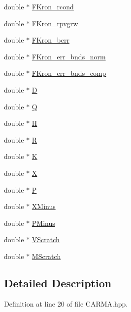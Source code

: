 \begin{DoxyCompactItemize}
\item 
double $\ast$ \hyperlink{class_c_a_r_m_a_a4d0801b15644b2e5b0580b0688119737}{F\-Kron\-\_\-rcond}
\item 
double $\ast$ \hyperlink{class_c_a_r_m_a_ae089a1c6d303b4c9573c943c0a729269}{F\-Kron\-\_\-rpvgrw}
\item 
double $\ast$ \hyperlink{class_c_a_r_m_a_acae4a7d06cd91dfc10cf0c1bf87f6689}{F\-Kron\-\_\-berr}
\item 
double $\ast$ \hyperlink{class_c_a_r_m_a_a859299a912a8613c5143b8b9878b5842}{F\-Kron\-\_\-err\-\_\-bnds\-\_\-norm}
\item 
double $\ast$ \hyperlink{class_c_a_r_m_a_ac95cc03cafb7ce94ecccf055462b487a}{F\-Kron\-\_\-err\-\_\-bnds\-\_\-comp}
\item 
double $\ast$ \hyperlink{class_c_a_r_m_a_a95cd26896bd2a97497be37295e039dc8}{D}
\item 
double $\ast$ \hyperlink{class_c_a_r_m_a_a1cd98bc094e960bcf7d8af55528ae72c}{Q}
\item 
double $\ast$ \hyperlink{class_c_a_r_m_a_aa2f506e700aa176fd5d8866552aa1f83}{H}
\item 
double $\ast$ \hyperlink{class_c_a_r_m_a_a40823ba436816d4e656185a3ae8a125f}{R}
\item 
double $\ast$ \hyperlink{class_c_a_r_m_a_a01b4c677af0ad6e7981851efe9fd3563}{K}
\item 
double $\ast$ \hyperlink{class_c_a_r_m_a_ad57c7f2816413aa6b7e98b147ad73712}{X}
\item 
double $\ast$ \hyperlink{class_c_a_r_m_a_ab6923d0ca4591a595c997549a0487cb3}{P}
\item 
double $\ast$ \hyperlink{class_c_a_r_m_a_a4f2333fe508efc7d8e59776aa98fdd50}{X\-Minus}
\item 
double $\ast$ \hyperlink{class_c_a_r_m_a_aa0f1ac4385f61138ce0ad9f5dfc10d06}{P\-Minus}
\item 
double $\ast$ \hyperlink{class_c_a_r_m_a_ad9d4a76333d0b578ce167d43801f9347}{V\-Scratch}
\item 
double $\ast$ \hyperlink{class_c_a_r_m_a_a17050731a928b7e2a024fd8c1b5acd6d}{M\-Scratch}
\end{DoxyCompactItemize}


\subsection{Detailed Description}


Definition at line 20 of file C\-A\-R\-M\-A.\-hpp.



